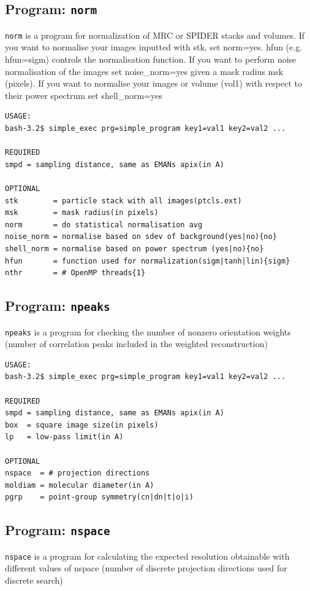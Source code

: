 \documentclass[a4paper,11pt]{article}
\newcommand{\prgname}[1]{\textcolor{NavyBlue}{\texttt{#1}}}
\begin{document}
\subsection{Program: \prgname{norm}}
\label{norm}
\prgname{norm} is a program for normalization of MRC or SPIDER stacks and volumes. If you want to normalise your images inputted with stk, set norm=yes. hfun (e.g. hfun=sigm) controls the normalisation function. If you want to perform noise normalisation of the images set noise\_norm=yes given a mask radius msk (pixels). If you want to normalise your images or volume (vol1) with respect to their power spectrum set shell\_norm=yes 

\begin{verbatim}
USAGE:
bash-3.2$ simple_exec prg=simple_program key1=val1 key2=val2 ...

REQUIRED
smpd = sampling distance, same as EMANs apix(in A)

OPTIONAL
stk        = particle stack with all images(ptcls.ext)
msk        = mask radius(in pixels)
norm       = do statistical normalisation avg
noise_norm = normalise based on sdev of background(yes|no){no}
shell_norm = normalise based on power spectrum (yes|no){no}
hfun       = function used for normalization(sigm|tanh|lin){sigm}
nthr       = # OpenMP threads{1}
\end{verbatim}

\subsection{Program: \prgname{npeaks}}
\label{npeaks}
\prgname{npeaks} is a program for checking the number of nonzero orientation weights (number of correlation peaks included in the weighted reconstruction)

\begin{verbatim}
USAGE:
bash-3.2$ simple_exec prg=simple_program key1=val1 key2=val2 ...

REQUIRED
smpd = sampling distance, same as EMANs apix(in A)
box  = square image size(in pixels)
lp   = low-pass limit(in A)

OPTIONAL
nspace  = # projection directions
moldiam = molecular diameter(in A)
pgrp    = point-group symmetry(cn|dn|t|o|i)
\end{verbatim}

\subsection{Program: \prgname{nspace}}
\label{nspace}
\prgname{nspace} is a program for calculating the expected resolution obtainable with different values of nspace (number of discrete projection directions used for discrete search)
\end{document}
